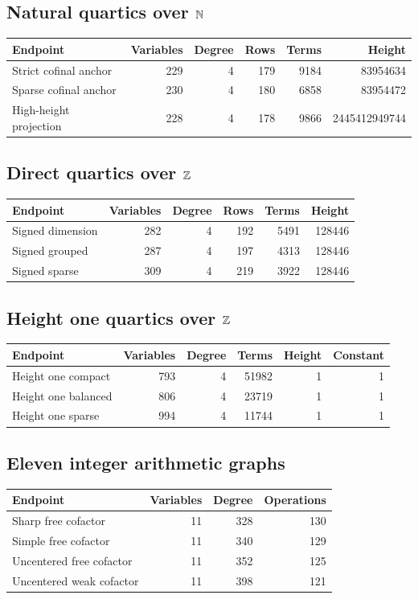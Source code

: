 \subsection*{Natural quartics over $\mathbb N$}
\begin{center}\small
\begin{tabular}{@{}lrrrrr@{}}\toprule
Endpoint&Variables&Degree&Rows&Terms&Height\\\midrule
Strict cofinal anchor&229&4&179&9184&83954634\\
Sparse cofinal anchor&230&4&180&6858&83954472\\
High-height projection&228&4&178&9866&2445412949744\\
\bottomrule\end{tabular}\end{center}
\subsection*{Direct quartics over $\mathbb Z$}
\begin{center}\small
\begin{tabular}{@{}lrrrrr@{}}\toprule
Endpoint&Variables&Degree&Rows&Terms&Height\\\midrule
Signed dimension&282&4&192&5491&128446\\
Signed grouped&287&4&197&4313&128446\\
Signed sparse&309&4&219&3922&128446\\
\bottomrule\end{tabular}\end{center}
\subsection*{Height one quartics over $\mathbb Z$}
\begin{center}\small
\begin{tabular}{@{}lrrrrr@{}}\toprule
Endpoint&Variables&Degree&Terms&Height&Constant\\\midrule
Height one compact&793&4&51982&1&1\\
Height one balanced&806&4&23719&1&1\\
Height one sparse&994&4&11744&1&1\\
\bottomrule\end{tabular}\end{center}
\subsection*{Eleven integer arithmetic graphs}
\begin{center}\small
\begin{tabular}{@{}lrrr@{}}\toprule
Endpoint&Variables&Degree&Operations\\\midrule
Sharp free cofactor&11&328&130\\
Simple free cofactor&11&340&129\\
Uncentered free cofactor&11&352&125\\
Uncentered weak cofactor&11&398&121\\
\bottomrule\end{tabular}\end{center}
